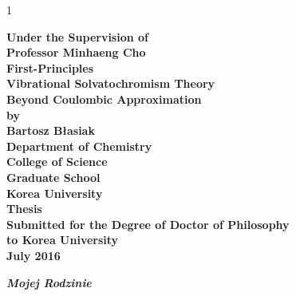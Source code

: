 \documentclass[b5paper,oneside,fleqn,11pt]{book}
\newenvironment{localspacing}[1]
      {\begin{spacing}{#1}}
      {\end{spacing}}
\newenvironment{dedication}
{
   \cleardoublepage
   \thispagestyle{empty}
   \vspace*{\stretch{1}}
   \hfill\begin{minipage}[t]{0.66\textwidth}
   \raggedright
}%
{
   \end{minipage}
   \vspace*{\stretch{3}}
   \clearpage
}
\begin{document}
\begin{localspacing}{1}
     \thispagestyle{empty}
     \begin{center}
     \vspace*{0.0cm} %
     {\LARGE \bf{Under the Supervision of}}\\[0.2cm]
     {\LARGE \bf{Professor Minhaeng Cho} }\\
     \vfill
     {\LARGE \bf{First-Principles\\[0.2cm]
                 Vibrational Solvatochromism Theory\\[0.2cm]
                 Beyond Coulombic Approximation}} \\
     \vfill
     {\LARGE \bf{by}}\\[0.2cm]
     {\LARGE \bf{Bartosz B{\l}asiak}}\\
     \vfill
     {\LARGE \bf{Department of Chemistry}}\\[0.2cm]
     {\LARGE \bf{College of Science}}\\[0.2cm]
     {\LARGE \bf{Graduate School}}\\[0.2cm]
     {\LARGE \bf{Korea University}}\\
     \vfill
     {\Large \bf{Thesis}}\\[0.2cm]
     {\Large \bf{Submitted for the Degree of Doctor of Philosophy}}\\[0.2cm]
     {\Large \bf{to Korea University}}\\[0.2cm]
     \vfill
     {\Large \bf{July 2016}}\\
     \end{center}
     \clearpage

\end{localspacing}
\begin{dedication}
  \bf{ \emph{Mojej Rodzinie}}
\end{dedication}
\end{document}
